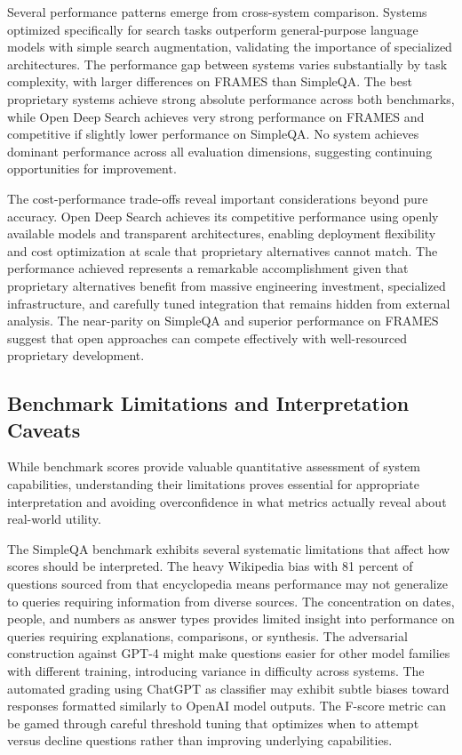 Several performance patterns emerge from cross-system comparison. Systems optimized specifically for search tasks outperform general-purpose language models with simple search augmentation, validating the importance of specialized architectures. The performance gap between systems varies substantially by task complexity, with larger differences on FRAMES than SimpleQA. The best proprietary systems achieve strong absolute performance across both benchmarks, while Open Deep Search achieves very strong performance on FRAMES and competitive if slightly lower performance on SimpleQA. No system achieves dominant performance across all evaluation dimensions, suggesting continuing opportunities for improvement.

The cost-performance trade-offs reveal important considerations beyond pure accuracy. Open Deep Search achieves its competitive performance using openly available models and transparent architectures, enabling deployment flexibility and cost optimization at scale that proprietary alternatives cannot match. The performance achieved represents a remarkable accomplishment given that proprietary alternatives benefit from massive engineering investment, specialized infrastructure, and carefully tuned integration that remains hidden from external analysis. The near-parity on SimpleQA and superior performance on FRAMES suggest that open approaches can compete effectively with well-resourced proprietary development.

\subsection{Benchmark Limitations and Interpretation Caveats}

While benchmark scores provide valuable quantitative assessment of system capabilities, understanding their limitations proves essential for appropriate interpretation and avoiding overconfidence in what metrics actually reveal about real-world utility.

The SimpleQA benchmark exhibits several systematic limitations that affect how scores should be interpreted. The heavy Wikipedia bias with 81 percent of questions sourced from that encyclopedia means performance may not generalize to queries requiring information from diverse sources. The concentration on dates, people, and numbers as answer types provides limited insight into performance on queries requiring explanations, comparisons, or synthesis. The adversarial construction against GPT-4 might make questions easier for other model families with different training, introducing variance in difficulty across systems. The automated grading using ChatGPT as classifier may exhibit subtle biases toward responses formatted similarly to OpenAI model outputs. The F-score metric can be gamed through careful threshold tuning that optimizes when to attempt versus decline questions rather than improving underlying capabilities.

